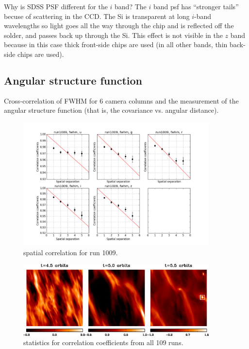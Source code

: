 Why is SDSS PSF different for the $i$ band? The $i$ band psf has ``stronger tails''
becuse of scattering in the CCD.  The Si is transparent at long $i$-band wavelengths 
so light goes all the way through the chip and is reflected off the solder, and passes 
back up through the Si. This effect is not visible in the $z$ band because in this case
thick front-side chips are used (in all other bands, thin back-side chips are used). 


\subsection{Angular structure function} 

Cross-correlation of FWHM for 6 camera columns and the measurement of the angular
structure function (that is, the covariance vs. angular distance). 

\begin{figure}
\centering
\includegraphics[width=0.9\textwidth]{FIGURES/spatial.png}
\caption{spatial correlation for run 1009. 
\label{fig:fwhm_lambda}}
\end{figure}

\begin{figure}
\centering
\includegraphics[width=0.9\textwidth]{FIGURES/f3.eps}
\caption{statistics for correlation coefficients from all 109 runs.
\label{fig:alpha_stat}}
\end{figure}


